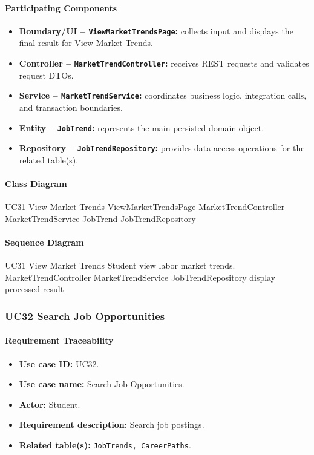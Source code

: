 \paragraph{Participating Components}

\begin{itemize}
    \item \textbf{Boundary/UI -- \texttt{ViewMarketTrendsPage}:} collects input and displays the final result for View Market Trends.
    \item \textbf{Controller -- \texttt{MarketTrendController}:} receives REST requests and validates request DTOs.
    \item \textbf{Service -- \texttt{MarketTrendService}:} coordinates business logic, integration calls, and transaction boundaries.
    \item \textbf{Entity -- \texttt{JobTrend}:} represents the main persisted domain object.
    \item \textbf{Repository -- \texttt{JobTrendRepository}:} provides data access operations for the related table(s).
\end{itemize}

\paragraph{Class Diagram}

\ClassDiagram
{UC31 View Market Trends}
{ViewMarketTrendsPage}
{MarketTrendController}
{MarketTrendService}
{JobTrend}
{JobTrendRepository}

\paragraph{Sequence Diagram}

\SequenceDiagram
{UC31 View Market Trends}
{Student}
{view labor market trends.}
{MarketTrendController}
{MarketTrendService}
{JobTrendRepository}
{display processed result}

\subsubsection{UC32 Search Job Opportunities}

\paragraph{Requirement Traceability}

\begin{itemize}
    \item \textbf{Use case ID:} UC32.
    \item \textbf{Use case name:} Search Job Opportunities.
    \item \textbf{Actor:} Student.
    \item \textbf{Requirement description:} Search job postings.
    \item \textbf{Related table(s):} \texttt{JobTrends, CareerPaths}.
\end{itemize}

